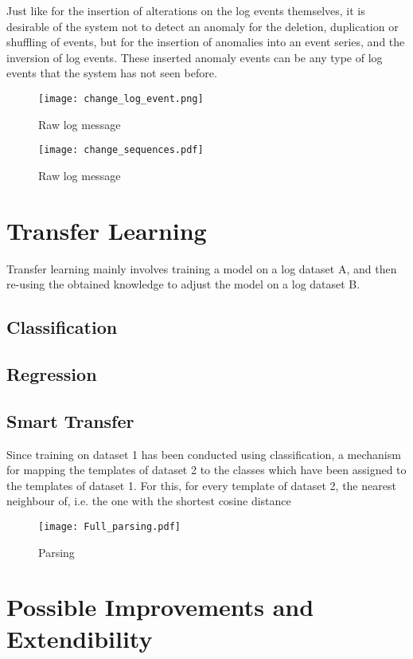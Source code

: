 Just like for the insertion of alterations on the log events themselves, it is desirable of the system not to detect an anomaly for the deletion, duplication or shuffling of events, but for the insertion of anomalies into an event series, and the inversion of log events. These inserted anomaly events can be any type of log events that the system has not seen before.


\begin{figure}[H]
	\centering
	\texttt{[image: change\_log\_event.png]}
	\caption{Raw log message}
	\label{fig:changelogevent}
\end{figure}

\begin{figure}[H]
	\centering
	\texttt{[image: change\_sequences.pdf]}
	\caption{Raw log message}
	\label{fig:changesequence}
\end{figure}




\section{Transfer Learning \label{sec:transferlearning}}
Transfer learning mainly involves training a model on a log dataset A, and then re-using the obtained knowledge to adjust the model on a log dataset B. 

\subsection{Classification \label{sec:transfer_classification}}

\subsection{Regression \label{sec:transfer_regression}}

\subsection{Smart Transfer}
Since training on dataset 1 has been conducted using classification, a mechanism for mapping the templates of dataset 2 to the classes which have been assigned to the templates of dataset 1. For this, for every template of dataset 2, the nearest neighbour of, i.e. the one with the shortest cosine distance 


\begin{figure}[htb]
  \centering
  \texttt{[image: Full\_parsing.pdf]}\\
  \caption{Parsing }
  \label{fig:Full pre-processing workflow}
\end{figure}


\section{Possible Improvements and Extendibility\label{sec:improvements}}


